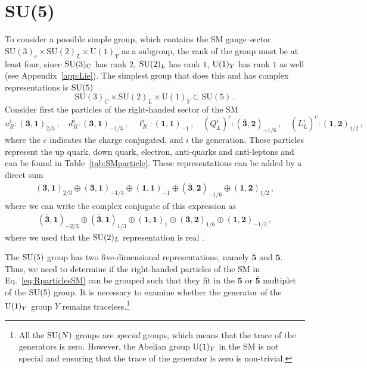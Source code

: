 \section{SU(5)}\label{sec:SU5}
To consider a possible simple group, which contains the SM gauge sector $\mathrm{SU}(3)_c\times\mathrm{SU}(2)_L\times\mathrm{U}(1)_Y$ as a subgroup, the rank of the group must be at least four, since $\mathrm{SU}(3)_C$ has rank $2$, $\mathrm{SU}(2)_L$ has rank $1$, $\mathrm{U}(1)_Y$ has rank $1$ as well (see Appendix~\ref{app:Lie}). The simplest group that does this and has complex representations is $\mathrm{SU}(5)$ \cite{Georgi:1999wka}
\begin{equation}
    \mathrm{SU}(3)_C\times\mathrm{SU}(2)_L\times\mathrm{U}(1)_Y\subset \mathrm{SU}(5)\,.
\end{equation}
Consider first the particles of the right-handed sector of the SM
\begin{equation}
    u_R^i : (\mathbf{3}, \mathbf{1})_{2/3} \,,\quad 
    d_R^i : (\mathbf{3}, \mathbf{1})_{-1/3} \,,\quad 
    \ell_R^i : (\mathbf{1}, \mathbf{1})_{-1} \,,\quad 
    (Q_L^i)^c : (\overline{\mathbf{3}}, \mathbf{2})_{-1/6} \,,\quad 
    (L_L^i)^c : (\mathbf{1}, \mathbf{2})_{1/2} \,, \label{eq:RparticlesSM}
\end{equation}
where the $c$ indicates the charge conjugated, and $i$ the generation. These particles represent the up quark, down quark, electron, anti-quarks and anti-leptons and can be found in Table~\ref{tab:SMparticle}. These representations can be added by a direct sum
\begin{align}
    (\mathbf{3},\mathbf{1})_{2/3} \oplus (\mathbf{3},\mathbf{1})_{-1/3} \oplus (\mathbf{1},\mathbf{1})_{-1} \oplus (\overline{\mathbf{3}},\mathbf{2})_{-1/6} \oplus (\mathbf{1},\mathbf{2})_{1/2} \,,
\end{align}
where we can write the complex conjugate of this expression as
\begin{align}
    (\overline{\mathbf{3}},\mathbf{1})_{-2/3} \oplus (\overline{\mathbf{3}},\mathbf{1})_{1/3} \oplus (\mathbf{1},\mathbf{1})_{1} \oplus (\mathbf{3},\mathbf{2})_{1/6} \oplus (\mathbf{1},\mathbf{2})_{-1/2} \,,
\end{align}
where we used that the $\mathrm{SU}(2)_L$ representation is real \cite{Georgi:1999wka}. 

The $\mathrm{SU}(5)$ group has two five-dimensional representations, namely $\overline{\mathbf{5}}$ and $\mathbf{5}$. Thus, we need to determine if the right-handed particles of the SM in Eq.~\eqref{eq:RparticlesSM} can be grouped such that they fit in the $\mathbf{5}$ or $\overline{\mathbf{5}}$ multiplet of the $\mathrm{SU}(5)$ group. It is necessary to examine whether the generator of the $\mathrm{U}(1)_Y$ group $Y$ remains traceless.\footnote{All the $\mathrm{SU}(N)$ groups are \textit{special} groups, which means that the trace of the generators is zero. However, the Abelian group $\mathrm{U}(1)_Y$ in the SM is not special and ensuring that the trace of the generator is zero is non-trivial. } 

